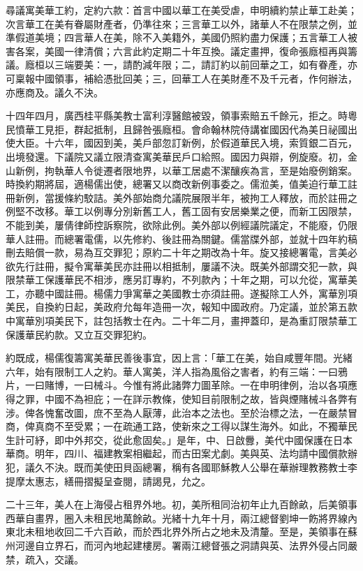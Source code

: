 \begin{pinyinscope}
尋議寓美華工約，定約六款：首言中國以華工在美受虐，申明續約禁止華工赴美；次言華工在美有眷屬財產者，仍準往來；三言華工以外，諸華人不在限禁之例，並準假道美境；四言華人在美，除不入美籍外，美國仍照約盡力保護；五言華工人被害各案，美國一律清償；六言此約定期二十年互換。議定畫押，復命張廕桓再與籌議。廕桓以三端要美：一，請酌減年限；二，請訂約以前回華之工，如有眷產，亦可稟報中國領事，補給憑批回美；三，回華工人在美財產不及千元者，作何辦法，亦應商及。議久不決。

十四年四月，廣西桂平縣美教士富利淳醫館被毀，領事索賠五千餘元，拒之。時粵民憤華工見拒，群起抵制，且歸咎張廕桓。會命翰林院侍講崔國因代為美日祕國出使大臣。十六年，國因到美，美戶部忽訂新例，於假道華民入境，索質銀二百元，出境發還。下議院又議立限清查寓美華民戶口給照。國因力與辯，例旋廢。初，金山新例，拘執華人令徙遷者限地界，以華工居處不潔釀疾為言，至是始廢例銷案。時換約期將屆，適楊儒出使，總署又以商改新例事委之。儒涖美，值美迫行華工註冊新例，當援條約駮詰。美外部始商允議院展限半年，被拘工人釋放，而於註冊之例堅不改移。華工以例專分別新舊工人，舊工固有安居樂業之便，而新工因限禁，不能到美，屢倩律師控訴察院，欲除此例。美外部以例經議院議定，不能廢，仍限華人註冊。而總署電儒，以先修約、後註冊為關鍵。儒當牒外部，並就十四年約稿刪去賠償一款，易為互交罪犯；原約二十年之期改為十年。旋又接總署電，言美必欲先行註冊，擬令寓華美民亦註冊以相抵制，屢議不決。既美外部謂交犯一款，與限禁華工保護華民不相涉，應另訂專約，不列款內；十年之期，可以允從，寓華美工，亦聽中國註冊。楊儒力爭寓華之美國教士亦須註冊。遂擬除工人外，寓華別項美民，自換約日起，美政府允每年造冊一次，報知中國政府。乃定議，並於第五款中寓華別項美民下，註包括教士在內。二十年二月，畫押蓋印，是為重訂限禁華工保護華民約款。又立互交罪犯約。

約既成，楊儒復籌寓美華民善後事宜，因上言：「華工在美，始自咸豐年間。光緒六年，始有限制工人之約。華人寓美，洋人指為風俗之害者，約有三端：一曰鴉片，一曰賭博，一曰械斗。今惟有將此諸弊力圖革除。一在申明律例，治以各項應得之罪，中國不為袒庇；一在詳示教條，使知目前限制之故，皆與煙賭械斗各弊有涉。俾各愧奮改圖，庶不至為人厭薄，此治本之法也。至於治標之法，一在嚴禁冒商，俾真商不至受累；一在疏通工路，使新來之工得以謀生海外。如此，不獨華民生計可紓，即中外邦交，從此愈固矣。」是年，中、日啟釁，美代中國保護在日本華商。明年，四川、福建教案相繼起，而古田案尤劇。美與英、法均請中國償款辦犯，議久不決。既而美使田貝函總署，稱有各國耶穌教人公舉在華辦理教務教士李提摩太惠志，繕冊摺擬呈查閱，請謁見，允之。

二十三年，美人在上海侵占租界外地。初，美所租同治初年止九百餘畝，后美領事西華自畫界，圈入未租民地萬餘畝。光緒十九年十月，兩江總督劉坤一飭將界線內東北未租地收回二千六百畝，而於西北界外所占之地未及清釐。至是，美領事在蘇州河邊自立界石，而河內地起建樓房。署兩江總督張之洞請與英、法界外侵占同嚴禁，疏入，交議。


\end{pinyinscope}
